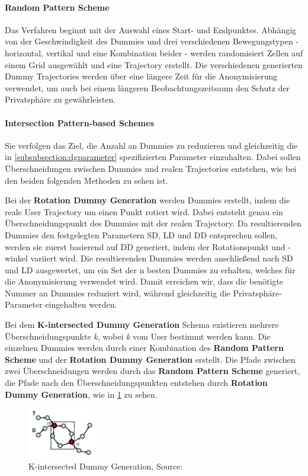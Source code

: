 	\paragraph{Random Pattern Scheme \cite{You2007}} Das Verfahren beginnt mit der Auswahl eines Start- und Endpunktes. Abhängig von der Geschwindigkeit des Dummies und drei verschiedenen Bewegungstypen - horizontal, vertikal und eine Kombination beider - werden randomisiert Zellen auf einem Grid ausgewählt und eine Trajectory erstellt. Die verschiedenen generierten Dummy Trajectories werden über eine längere Zeit für die Anonymisierung verwendet, um auch bei einem längeren Beobachtungszeitsaum den Schutz der Privatsphäre zu gewährleisten.
	\paragraph{Intersection Pattern-based Schemes \cite{Lei2012}} Sie verfolgen das Ziel, die Anzahl an Dummies zu reduzieren und gleichzeitig die in \ref{subsubsection:dgparameter} spezifizierten Parameter einzuhalten. Dabei sollen Überschneidungen zwischen Dummies und realen Trajectories entstehen, wie bei den beiden folgenden Methoden zu sehen ist.
	
	Bei der \textbf{Rotation Dummy Generation} werden Dummies erstellt, indem die reale User Trajectory um einen Punkt rotiert wird. Dabei entsteht genau ein Überschneidungspunkt des Dummies mit der realen Trajectory. Da resultierenden Dummies den festgelegten Parametern SD, LD und DD entsprechen sollen, werden sie zuerst basierend auf DD generiert, indem der Rotationspunkt und -winkel variiert wird. Die resultierenden Dummies werden anschließend nach SD und LD ausgewertet, um ein Set der n besten Dummies zu erhalten, welches für die Anonymisierung verwendet wird. Damit erreichen wir, dass die benötigte Nummer an Dummies reduziert wird, während gleichzeitig die Privatsphäre-Parameter eingehalten werden.
	
	Bei dem \textbf{K-intersected Dummy Generation} Schema existieren mehrere Überschneidungspunkte \textit{k}, wobei \textit{k} vom User bestimmt werden kann. Die einzelnen Dummies werden durch einer Kombination des \textbf{Random Pattern Scheme} und der \textbf{Rotation Dummy Generation} erstellt. Die Pfade zwischen zwei Überschneidungen werden durch das \textbf{Random Pattern Scheme} generiert, die Pfade nach den Überschneidungspunkten entstehen durch \textbf{Rotation Dummy Generation}, wie in \ref{fig_Lei2012KD} zu sehen.
	\begin{figure}[!h]
		\centering
		\includegraphics[width=3cm]{Bilder/Lei2012KD.png}
		\caption{K-intersected Dummy Generation, Source: \protect\cite{Lei2012}}
		\label{fig_Lei2012KD}
	\end{figure}

